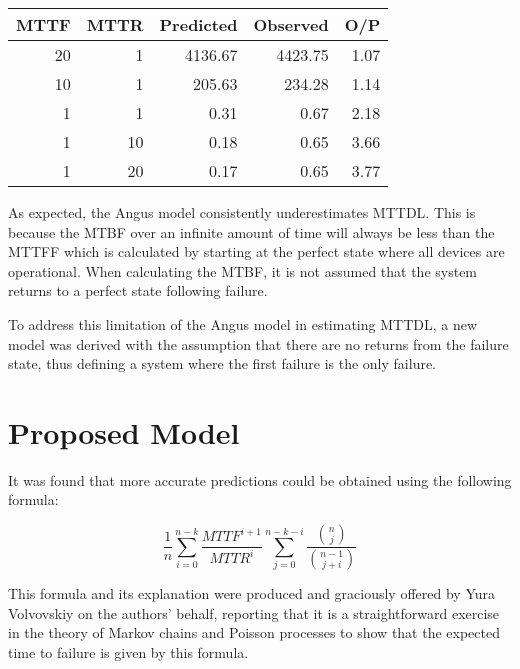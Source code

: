 \documentclass[XXX,endnotes]{usetex-v1}
\begin{document}
\begin{center}
  \begin{tabular}{ | r | r | r | r | r | }
    \hline
      MTTF       & MTTR     & Predicted    & Observed  & O/P        \\ \hline
      20         & 1        & 4136.67      & 4423.75   & 1.07       \\ \hline
      10         & 1        & 205.63       & 234.28    & 1.14       \\ \hline
      1          & 1        & 0.31         & 0.67      & 2.18       \\ \hline
      1          & 10       & 0.18         & 0.65      & 3.66       \\ \hline
      1          & 20       & 0.17         & 0.65      & 3.77       \\ \hline
  \end{tabular}
\end{center}

As expected, the Angus model consistently underestimates MTTDL.  This is because the MTBF over an infinite amount of time will always be less than the MTTFF which is calculated by starting at the perfect state where all devices are operational.  When calculating the MTBF, it is not assumed that the system returns to a perfect state following failure.

To address this limitation of the Angus model in estimating MTTDL, a new model was derived with the assumption that there are no returns from the failure state, thus defining a system where the first failure is the only failure.

\section{Proposed Model}

It was found that more accurate predictions could be obtained using the following formula:

\begin{equation}
\label{mttdl}
\frac{1}{n} \sum_{i=0}^{n-k} \frac{MTTF^{i+1}}{MTTR^{i}} \sum_{j=0}^{n-k-i} \frac{{{n}\choose{j}}}{{{n-1}\choose{j+i}}}
\end{equation}

This formula and its explanation were produced and graciously offered by Yura Volvovskiy on the authors' behalf, reporting that it is a straightforward exercise in the theory of Markov chains and Poisson processes to show that the expected time to failure is given by this formula.
\end{document}
